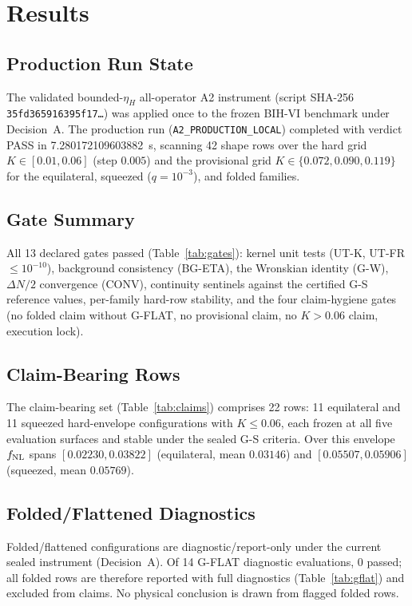 \section{Results}

\subsection{Production Run State}

The validated bounded-$\eta_H$ all-operator A2 instrument (script SHA-256 \texttt{35fd365916395f17\ldots}) was applied once to the frozen BIH-VI benchmark under Decision~A. The production run (\texttt{A2\_PRODUCTION\_LOCAL}) completed with verdict PASS in 7.280172109603882~s, scanning 42 shape rows over the hard grid $K \in [0.01, 0.06]$ (step $0.005$) and the provisional grid $K \in \{0.072, 0.090, 0.119\}$ for the equilateral, squeezed ($q = 10^{-3}$), and folded families.

\subsection{Gate Summary}

All 13 declared gates passed (Table~\ref{tab:gates}): kernel unit tests (UT-K, UT-FR $\leq 10^{-10}$), background consistency (BG-ETA), the Wronskian identity (G-W), $\Delta N/2$ convergence (CONV), continuity sentinels against the certified G-S reference values, per-family hard-row stability, and the four claim-hygiene gates (no folded claim without G-FLAT, no provisional claim, no $K > 0.06$ claim, execution lock).

\subsection{Claim-Bearing Rows}

The claim-bearing set (Table~\ref{tab:claims}) comprises 22 rows: 11 equilateral and 11 squeezed hard-envelope configurations with $K \leq 0.06$, each frozen at all five evaluation surfaces and stable under the sealed G-S criteria. Over this envelope $f_{\rm NL}$ spans $[0.02230, 0.03822]$ (equilateral, mean $0.03146$) and $[0.05507, 0.05906]$ (squeezed, mean $0.05769$).

\subsection{Folded/Flattened Diagnostics}

Folded/flattened configurations are diagnostic/report-only under the current sealed instrument (Decision~A). Of 14 G-FLAT diagnostic evaluations, 0 passed; all folded rows are therefore reported with full diagnostics (Table~\ref{tab:gflat}) and excluded from claims. No physical conclusion is drawn from flagged folded rows.

